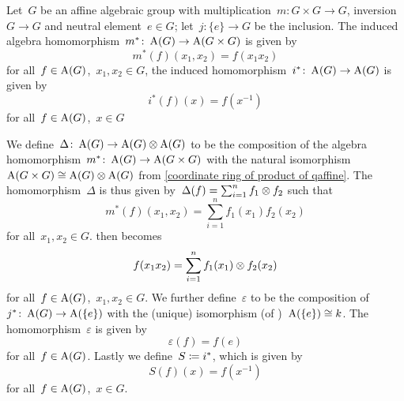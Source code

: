 \begin{fluff}
  Let~$G$ be an affine algebraic group with multiplication~$m \colon G \times G \to G$, inversion~$G \to G$ and neutral element~$e \in G$;
  let~$j \colon \{e\} \to G$ be the inclusion.
  The induced algebra homomorphism~$m^* \colon \operatorname{A}(G) \to \operatorname{A}(G \times G)$ is given by
  \begin{equation}
  \label{action of mstar}
      m^*(f)(x_1, x_2)
    = f(x_1 x_2)
  \end{equation}
  for all~$f \in \operatorname{A}(G)$,~$x_1, x_2 \in G$, the induced homomorphism~$i^* \colon \operatorname{A}(G) \to \operatorname{A}(G)$ is given by
  \[
      i^*(f)(x)
    = f(x^{-1})
  \]
  for all~$f \in \operatorname{A}(G)$,~$x \in G$
  
  We define~$\Delta \colon \operatorname{A}(G) \to \operatorname{A}(G) \mathbin{\otimes} \operatorname{A}(G)$ to be the composition of the algebra homomorphism~$m^* \colon \operatorname{A}(G) \to \operatorname{A}(G \times G)$ with the natural isomorphism~$\operatorname{A}(G \times G) \cong \operatorname{A}(G) \mathbin{\otimes} \operatorname{A}(G)$ from \cref{coordinate ring of product of qaffine}.
  The homomorphism~$\Delta$ is thus given by~$\Delta(f) = \sum_{i=1}^n f_1 \mathbin{\otimes} f_2$ such that
  \[
      m^*(f)(x_1, x_2)
    = \sum_{i=1}^n f_1(x_1) f_2(x_2)
  \]
  for all~$x_1, x_2 \in G$.
   then becomes
  \[
      f(x_1 x_2)
    = \sum_{i=1}^n f_1(x_1) \mathbin{\otimes} f_2(x_2)
  \]
  for all~$f \in \operatorname{A}(G)$,~$x_1, x_2 \in G$.  
  We further define~$\varepsilon$ to be the composition of~$j^* \colon \operatorname{A}(G) \to \operatorname{A}(\{e\})$ with the (unique) isomorphism (of )~$\operatorname{A}(\{e\}) \cong k$.
  The homomorphism~$\varepsilon$ is given by
  \[
      \varepsilon(f)
    = f(e)
  \]
  for all~$f \in \operatorname{A}(G)$.
  Lastly we define~$S \coloneqq i^*$, which is given by
  \[
      S(f)(x)
    = f(x^{-1})
  \]
  for all~$f \in \operatorname{A}(G)$,~$x \in G$.
  

\end{fluff}
